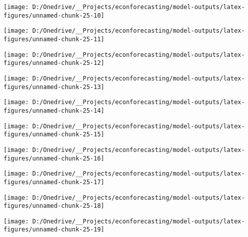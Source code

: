 \documentclass[11pt, letterpaper]{article}\usepackage[]{graphicx}\usepackage[]{color}
\begin{document}
{\centering \texttt{[image: D:/Onedrive/\_\_Projects/econforecasting/model-outputs/latex-figures/unnamed-chunk-25-10]} 

}




{\centering \texttt{[image: D:/Onedrive/\_\_Projects/econforecasting/model-outputs/latex-figures/unnamed-chunk-25-11]} 

}




{\centering \texttt{[image: D:/Onedrive/\_\_Projects/econforecasting/model-outputs/latex-figures/unnamed-chunk-25-12]} 

}




{\centering \texttt{[image: D:/Onedrive/\_\_Projects/econforecasting/model-outputs/latex-figures/unnamed-chunk-25-13]} 

}




{\centering \texttt{[image: D:/Onedrive/\_\_Projects/econforecasting/model-outputs/latex-figures/unnamed-chunk-25-14]} 

}




{\centering \texttt{[image: D:/Onedrive/\_\_Projects/econforecasting/model-outputs/latex-figures/unnamed-chunk-25-15]} 

}




{\centering \texttt{[image: D:/Onedrive/\_\_Projects/econforecasting/model-outputs/latex-figures/unnamed-chunk-25-16]} 

}




{\centering \texttt{[image: D:/Onedrive/\_\_Projects/econforecasting/model-outputs/latex-figures/unnamed-chunk-25-17]} 

}




{\centering \texttt{[image: D:/Onedrive/\_\_Projects/econforecasting/model-outputs/latex-figures/unnamed-chunk-25-18]} 

}




{\centering \texttt{[image: D:/Onedrive/\_\_Projects/econforecasting/model-outputs/latex-figures/unnamed-chunk-25-19]} 

}
\end{document}
